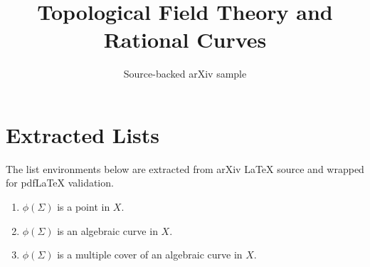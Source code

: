 \documentclass[11pt]{article}
\title{Topological Field Theory and Rational Curves}
\author{Source-backed arXiv sample}
\date{}
\begin{document}
\maketitle
\section{Extracted Lists}

The list environments below are extracted from arXiv LaTeX source and wrapped for pdfLaTeX validation.

\begin{enumerate}
  \item $\phi(\Sigma)$ is a point in $X$.
  \item $\phi(\Sigma)$ is an algebraic curve in $X$.
  \item $\phi(\Sigma)$ is a multiple cover of an algebraic curve in
	$X$.
\end{enumerate}
\end{document}

